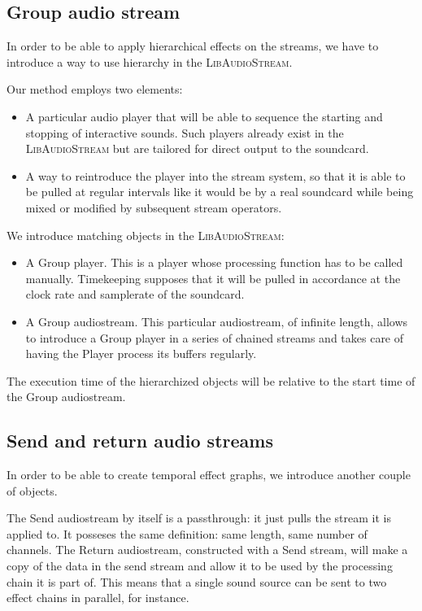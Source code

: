\documentclass{article}
\newcommand*{\LibAudioStream}{\textsc{LibAudioStream}\xspace}
\begin{document}
\subsection{Group audio stream}
In order to be able to apply hierarchical effects on the streams, 
we have to introduce a way to use hierarchy in the \LibAudioStream.

Our method employs two elements: 
\begin{itemize}
	\item A particular audio player that will be able to sequence the starting and stopping 
	of interactive sounds.
	Such players already exist in the \LibAudioStream but are tailored for direct output to
	the soundcard.
	\item A way to reintroduce the player into the stream system, so that it 
	is able to be pulled at regular intervals like it would be by a real soundcard while being mixed or modified by subsequent stream operators.
\end{itemize}

We introduce matching objects in the \LibAudioStream: 
\begin{itemize}
	\item A Group player. This is a player whose processing function has to be called manually. 
	Timekeeping supposes that it will be pulled in accordance at the clock rate
	and samplerate of the soundcard.
	\item A Group audiostream. This particular audiostream, of infinite length, 
	allows to introduce a Group player in a series of chained streams and takes care of having the Player process its buffers
    regularly.
\end{itemize}

The execution time of the hierarchized objects will be relative to the start time of the Group audiostream.

\subsection{Send and return audio streams}
In order to be able to create temporal effect graphs, we introduce another couple of objects.

The Send audiostream by itself is a passthrough: it just pulls the stream it is applied to.
It posseses the same definition: same length, same number of channels.
The Return audiostream, constructed with a Send stream, will make a copy of the data in 
the send stream and allow it to be used by the processing chain it is part of.
This means that a single sound source can be sent to two effect chains in parallel, for instance.
\end{document}
